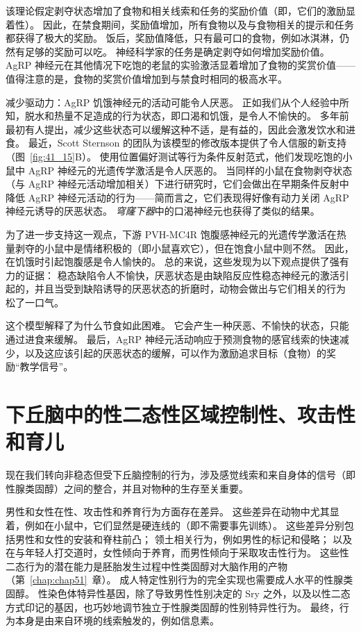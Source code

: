 该理论假定剥夺状态增加了食物和相关线索和任务的奖励价值（即，它们的激励显着性）。
因此，在禁食期间，奖励值增加，所有食物以及与食物相关的提示和任务都获得了极大的奖励。
饭后，奖励值降低，只有最可口的食物，例如冰淇淋，仍然有足够的奖励可以吃。
神经科学家的任务是确定剥夺如何增加奖励价值。
AgRP 神经元在其他情况下吃饱的老鼠的实验激活显着增加了食物的奖赏价值——值得注意的是，食物的奖赏价值增加到与禁食时相同的极高水平。


减少驱动力：AgRP 饥饿神经元的活动可能令人厌恶。
正如我们从个人经验中所知，脱水和热量不足造成的行为状态，即口渴和饥饿，是令人不愉快的。
多年前最初有人提出，减少这些状态可以缓解这种不适，是有益的，因此会激发饮水和进食。
最近，Scott Sternson 的团队为该模型的修改版本提供了令人信服的新支持（图~\ref{fig:41_15}B）。
使用位置偏好测试等行为条件反射范式，他们发现吃饱的小鼠中 AgRP 神经元的光遗传学激活是令人厌恶的。
当同样的小鼠在食物剥夺状态（与 AgRP 神经元活动增加相关）下进行研究时，它们会做出在早期条件反射中降低 AgRP 神经元活动的行为——简而言之，它们表现得好像有动力关闭 AgRP 神经元诱导的厌恶状态。
\textit{穹窿下器}中的口渴神经元也获得了类似的结果。


为了进一步支持这一观点，下游 PVH-MC4R 饱腹感神经元的光遗传学激活在热量剥夺的小鼠中是情绪积极的（即小鼠喜欢它），但在饱食小鼠中则不然。
因此，在饥饿时引起饱腹感是令人愉快的。
总的来说，这些发现为以下观点提供了强有力的证据：
稳态缺陷令人不愉快，厌恶状态是由缺陷反应性稳态神经元的激活引起的，并且当受到缺陷诱导的厌恶状态的折磨时，动物会做出与它们相关的行为 松了一口气。


这个模型解释了为什么节食如此困难。
它会产生一种厌恶、不愉快的状态，只能通过进食来缓解。
最后，AgRP 神经元活动响应于预测食物的感官线索的快速减少，以及这应该引起的厌恶状态的缓解，可以作为激励追求目标（食物）的奖励“教学信号”。



\section{下丘脑中的性二态性区域控制性、攻击性和育儿}

现在我们转向非稳态但受下丘脑控制的行为，涉及感觉线索和来自身体的信号（即性腺类固醇）之间的整合，并且对物种的生存至关重要。


男性和女性在性、攻击性和养育行为方面存在差异。
这些差异在动物中尤其显着，例如在小鼠中，它们显然是硬连线的（即不需要事先训练）。
这些差异分别包括男性和女性的安装和脊柱前凸；
领土相关行为，例如男性的标记和侵略； 以及在与年轻人打交道时，女性倾向于养育，而男性倾向于采取攻击性行为。
这些性二态行为的潜在能力是胚胎发生过程中性类固醇对大脑作用的产物（第~\ref{chap:chap51}~章）。
成人特定性别行为的完全实现也需要成人水平的性腺类固醇。
性染色体特异性基因，除了导致男性性别决定的 Sry 之外，以及以性二态方式印记的基因，也巧妙地调节独立于性腺类固醇的性别特异性行为。
最终，行为本身是由来自环境的线索触发的，例如信息素。


